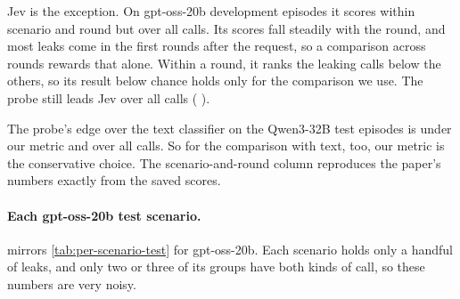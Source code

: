 Jev is the exception.
On gpt-oss-20b development episodes it scores \eEighteenGptDevJevRound{} within scenario and round but \eEighteenGptDevJevPooled{} over all calls.
Its scores fall steadily with the round, and most leaks come in the first rounds after the request, so a comparison across rounds rewards that alone.
Within a round, it ranks the leaking calls below the others, so its result below chance holds only for the comparison we use.
The probe still leads Jev over all calls (\eEighteenGptDevProbeMinusJevPooled{} \eEighteenGptDevProbeMinusJevPooledCI{}).

The probe's edge over the text classifier on the Qwen3-32B test episodes is \eEighteenQwenTestProbeMinusTextRound{} \eEighteenQwenTestProbeMinusTextRoundCI{} under our metric and \eEighteenQwenTestProbeMinusTextPooled{} \eEighteenQwenTestProbeMinusTextPooledCI{} over all calls.
So for the comparison with text, too, our metric is the conservative choice.
The scenario-and-round column reproduces the paper's numbers exactly from the saved scores.

\begin{table}[h]
  \centering
  \small
  
  \caption{\textbf{Per-call AUROC under three ways of choosing which calls to compare.} Scenario and round is the metric used throughout the paper. Scenario only compares calls across all rounds of a scenario; all calls compares every leaking call with every non-leaking call. One group out gives the lowest and highest AUROC when any single kept scenario-and-round group is removed. All rows use saved scores, with 95\% episode-clustered bootstrap intervals.}
  \label{tab:metric-variants}
\end{table}

\paragraph{Each gpt-oss-20b test scenario.}
 mirrors \cref{tab:per-scenario-test} for gpt-oss-20b.
Each scenario holds only a handful of leaks, and only two or three of its groups have both kinds of call, so these numbers are very noisy.

\begin{table}[h]
  \centering
  \small
  
  \caption{\textbf{The two gpt-oss-20b probes on each test scenario.} AUROC within scenario and round, from the frozen test scores. Groups kept are scenario-and-round groups that hold both leaking and non-leaking calls.}
  \label{tab:gpt-scenarios-test}
\end{table}

